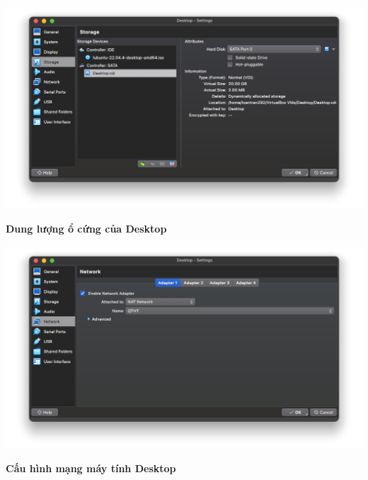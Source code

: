 \begin{minipage}{.93\linewidth}
  \captionsetup{type=figure}
  \includegraphics[width=\linewidth]{./imgs/Hinh-10.png}
  \caption{\bfseries Dung lượng ổ cứng của Desktop}
  \label{fig:desktop-disk}
\end{minipage}


\begin{minipage}{.93\linewidth}
  \captionsetup{type=figure}
  \includegraphics[width=\linewidth]{./imgs/Hinh-11.png}
  \caption{\bfseries Cấu hình mạng máy tính Desktop}
  \label{fig:desktop-network-1}
\end{minipage}


